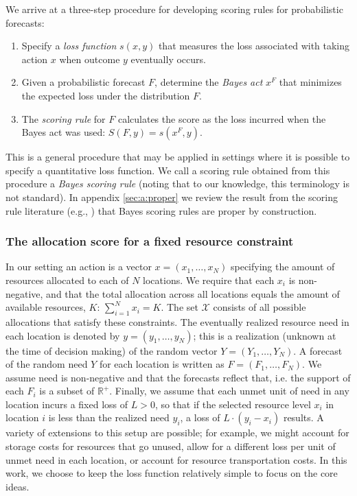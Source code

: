 \documentclass{article}\usepackage[]{graphicx}\usepackage[]{xcolor}
\begin{document}
We arrive at a three-step procedure for developing scoring rules for probabilistic forecasts:
\begin{enumerate}
  \item Specify a \emph{loss function} $s(x, y)$ that measures the loss associated with taking action $x$ when outcome $y$
    eventually occurs.
  \item Given a probabilistic forecast $F$, determine the \emph{Bayes act} $x^F$ that minimizes the expected loss under
    the distribution $F$.
  \item The \emph{scoring rule} for $F$ calculates the score as the loss incurred when the Bayes act was used: 
    $S(F, y) = s(x^F, y)$.
\end{enumerate}
This is a general procedure that may be applied in settings where it is possible to specify a quantitative loss
function. We call a scoring rule obtained from this procedure a \emph{Bayes scoring rule} (noting that to our knowledge, 
this terminology is not standard).  In appendix \ref{sec:a:proper} we review the
result from the scoring rule literature (e.g., \cite{dawid2007geometry,gneiting2007strictly}) that Bayes scoring
rules are proper by construction.

\subsubsection{The allocation score for a fixed resource constraint}
\label{sec:methods.detailed.specific_allocation}

In our setting an action is a vector $x = (x_1, \ldots, x_N)$ specifying the amount of resources allocated to each of
$N$ locations. We require that each $x_i$ is non-negative, and that the total allocation across
all locations equals the amount of available resources, $K$: $\sum_{i=1}^N x_i = K$. The set $\mathcal{X}$ consists of
all possible allocations that satisfy these constraints. The eventually realized resource need in each location is
denoted by $y = (y_1, \ldots, y_N)$; this is a realization (unknown at the
time of decision making) of the random vector $Y = (Y_1, \ldots, Y_N)$. A forecast of the random need $Y$ for each
location is written as $F = (F_1, \ldots, F_N)$. We assume need is non-negative and that the forecasts reflect that, i.e. the
support of each $F_i$ is a subset of $\mathbb{R}^+$. Finally, we assume that each unmet unit of need in any location
incurs a fixed loss of $L>0$, so that if the selected resource level $x_i$ in location $i$ is less than the realized
need $y_i$, a loss of $L \cdot (y_i - x_i)$ results. A variety of extensions to this setup are possible; for example, we
might account for storage costs for resources that go unused, allow for a different loss per unit of unmet need in each
location, or account for resource transportation costs. In this work, we choose to keep the loss function relatively
simple to focus on the core ideas.
\end{document}
